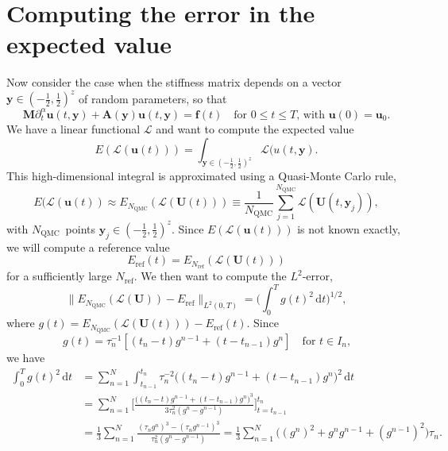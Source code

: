 \documentclass[a4paper,12pt]{article}
\newcommand{\bs}[1]{\boldsymbol{#1}}
\newcommand{\ud}{\mathrm{d}}
\newcommand{\NQMC}{N_{\mathrm{QMC}}}
\newcommand{\Eref}{E_{\mathrm{ref}}}
\begin{document}
\section{Computing the error in the expected value}

Now consider the case when the stiffness matrix depends on a
vector~$\bs{y}\in(-\tfrac12,\tfrac12)^z$ of random parameters, so that
\[
\bs{M}\partial_t^\alpha\bs{u}(t,\bs{y})+\bs{A}(\bs{y})\bs{u}(t,\bs{y})
    =\bs{f}(t)\quad\text{for $0\le t\le T$, with $\bs{u}(0)=\bs{u}_0$.}
\]
We have a linear functional $\mathcal{L}$ and want to compute the expected value
\[
E(\mathcal{L}(\bs{u}(t)))
=\int_{\bs{y}\in(-\tfrac12,\tfrac12)^z}\mathcal{L}(u(t,\bs{y}).
\]
This high-dimensional integral is approximated using a Quasi-Monte Carlo rule,
\[
E(\mathcal{L}(\bs{u}(t))\approx E_{\NQMC}(\mathcal{L}(\bs{U}(t)))\equiv
\frac{1}{\NQMC}\sum_{j=1}^{\NQMC}\mathcal{L}(\bs{U}(t,\bs{y}_j)),
\]
with $\NQMC$~points $\bs{y}_j\in(-\tfrac12,\tfrac12)^z$.
Since $E(\mathcal{L}(\bs{u}(t)))$ is not known exactly, we will compute a
reference value
\[
\Eref(t)=E_{N_{\mathrm{ref}}}(\mathcal{L}(\bs{U}(t)))
\]
for a sufficiently large $N_{\mathrm{ref}}$.  We then want to compute the
$L^2$-error,
\[
\|E_{\NQMC}(\mathcal{L}(\bs{U}))-\Eref\|_{L^2(0,T)}
=\biggl(\int_0^T g(t)^2\,\ud t\biggr)^{1/2},
\]
where $g(t)=E_{\NQMC}(\mathcal{L}(\bs{U}(t)))-\Eref(t)$.  Since
\[
g(t)=\tau_n^{-1}[(t_n-t)g^{n-1}+(t-t_{n-1})g^n]\quad\text{for $t\in I_n$,}
\]
we have
\begin{align*}
\int_0^Tg(t)^2\,\ud t&=\sum_{n=1}^N\int_{t_{n-1}}^{t_n}\tau_n^{-2}
    \bigl((t_n-t)g^{n-1}+(t-t_{n-1})g^n\bigr)^2\,\ud t\\
&=\sum_{n=1}^N\biggl[
\frac{\bigl((t_n-t)g^{n-1}+(t-t_{n-1})g^n\bigr)^3}{3\tau_n^2(g^n-g^{n-1})}
\biggr]_{t=t_{n-1}}^{t_n}\\
&=\frac{1}{3}\sum_{n=1}^N\frac{(\tau_ng^n)^3-(\tau_ng^{n-1})^3}%
{\tau_n^2(g^n-g^{n-1})}
=\frac{1}{3}\sum_{n=1}^N\bigl((g^n)^2+g^ng^{n-1}+(g^{n-1})^2\bigr)\tau_n.
\end{align*}
\end{document}
